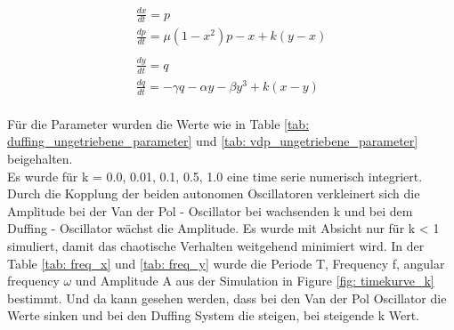 \documentclass[oneside,10pt,a4paper]{report}
\begin{document}
			\begin{equation}\label{eq: vdp_duffing_Lösung}		
			\begin{gathered}
				\frac{dx}{dt} = p\\
				\frac{dp}{dt} = \mu (1 - x^2) p - x +k ( y- x )\\
				\\
				\frac{dy}{dt} = q\\
				\frac{dq}{dt} = - \gamma q - \alpha y - \beta y^3 + k ( x-y )\\
			\end{gathered}		
		\end{equation}
		
		Für die Parameter wurden die Werte wie in Table \ref*{tab: duffing_ungetriebene_parameter} und \ref{tab: vdp_ungetriebene_parameter} beigehalten.\\
		Es wurde für k = 0.0, 0.01, 0.1, 0.5, 1.0 eine time serie numerisch integriert.\\
		Durch die Kopplung der beiden autonomen Oscillatoren verkleinert sich die Amplitude bei der Van der Pol - Oscillator bei wachsenden k und bei dem Duffing - Oscillator wächst die Amplitude.
		Es wurde mit Absicht nur für k < 1 simuliert, damit das chaotische Verhalten weitgehend minimiert wird. In der Table \ref{tab: freq_x} und \ref{tab: freq_y} wurde die Periode T, Frequency f, angular frequency $\omega$ und Amplitude A aus der Simulation in Figure \ref{fig: timekurve_k} bestimmt. Und da kann gesehen werden, dass bei den Van der Pol Oscillator die Werte sinken und bei den Duffing System die steigen, bei steigende k Wert.\\
		
\end{document}
